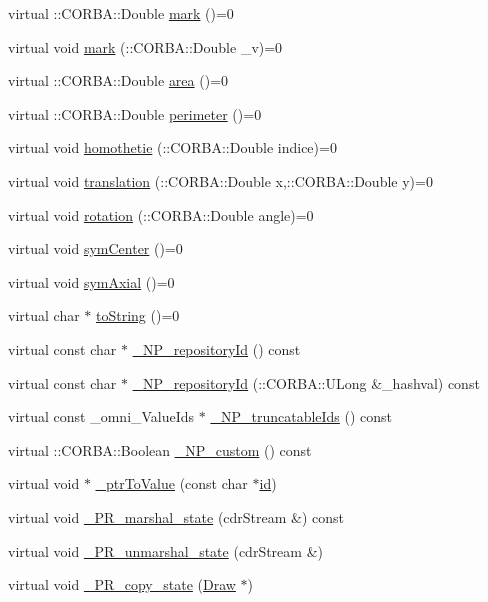 \begin{DoxyCompactItemize}
\item 
virtual \+::C\+O\+R\+B\+A\+::\+Double \hyperlink{class_draw_a24995593a9bf2ae75e2bfd9360064fa8}{mark} ()=0
\item 
virtual void \hyperlink{class_draw_aa4e3152cacbeda31c43d1fab6f54f4f2}{mark} (\+::C\+O\+R\+B\+A\+::\+Double \+\_\+v)=0
\item 
virtual \+::C\+O\+R\+B\+A\+::\+Double \hyperlink{class_draw_a0fb84e185ec13237aa456962d1eb0816}{area} ()=0
\item 
virtual \+::C\+O\+R\+B\+A\+::\+Double \hyperlink{class_draw_a7171f2b64135c81a41cb5a7a9926af52}{perimeter} ()=0
\item 
virtual void \hyperlink{class_draw_a39387bf248da4d7d91bee9099d4b6fca}{homothetie} (\+::C\+O\+R\+B\+A\+::\+Double indice)=0
\item 
virtual void \hyperlink{class_draw_a71e63b40c9505098652a94e06872fdc6}{translation} (\+::C\+O\+R\+B\+A\+::\+Double x,\+::C\+O\+R\+B\+A\+::\+Double y)=0
\item 
virtual void \hyperlink{class_draw_ab45c311ee0963a1a5e3ba3ac461e467c}{rotation} (\+::C\+O\+R\+B\+A\+::\+Double angle)=0
\item 
virtual void \hyperlink{class_draw_a1a10bbbeb1ccd4b10b04226f3fe10755}{sym\+Center} ()=0
\item 
virtual void \hyperlink{class_draw_aede358197311244da0fe937fb7e9573e}{sym\+Axial} ()=0
\item 
virtual char $\ast$ \hyperlink{class_draw_a0dd9c8b5127149b28e54bd602c797cca}{to\+String} ()=0
\item 
virtual const char $\ast$ \hyperlink{class_draw_a90d2c0a9b6aed68ca30ea2a7187317dc}{\+\_\+\+N\+P\+\_\+repository\+Id} () const 
\item 
virtual const char $\ast$ \hyperlink{class_draw_ae24df04b0f119c2fb6fd525a041f081d}{\+\_\+\+N\+P\+\_\+repository\+Id} (\+::C\+O\+R\+B\+A\+::\+U\+Long \&\+\_\+hashval) const 
\item 
virtual const \+\_\+omni\+\_\+\+Value\+Ids $\ast$ \hyperlink{class_draw_a10a319bcb2ef5d6ac5439859fe9f126e}{\+\_\+\+N\+P\+\_\+truncatable\+Ids} () const 
\item 
virtual \+::C\+O\+R\+B\+A\+::\+Boolean \hyperlink{class_draw_aab5e3083274138f65200f2516df70510}{\+\_\+\+N\+P\+\_\+custom} () const 
\item 
virtual void $\ast$ \hyperlink{class_draw_a2924173c6238dd077531f555324155b9}{\+\_\+ptr\+To\+Value} (const char $\ast$\hyperlink{class_draw_a1bf27c5a59da9002d55936c947dce2cc}{id})
\item 
virtual void \hyperlink{class_draw_adfa1e0ac94bad822e332caeddc17f02a}{\+\_\+\+P\+R\+\_\+marshal\+\_\+state} (cdr\+Stream \&) const 
\item 
virtual void \hyperlink{class_draw_a62dc59ec12f9ebd4da1f3448dbec683f}{\+\_\+\+P\+R\+\_\+unmarshal\+\_\+state} (cdr\+Stream \&)
\item 
virtual void \hyperlink{class_draw_a5832713920beeb0d47ef83caf919f185}{\+\_\+\+P\+R\+\_\+copy\+\_\+state} (\hyperlink{class_draw}{Draw} $\ast$)
\end{DoxyCompactItemize}
